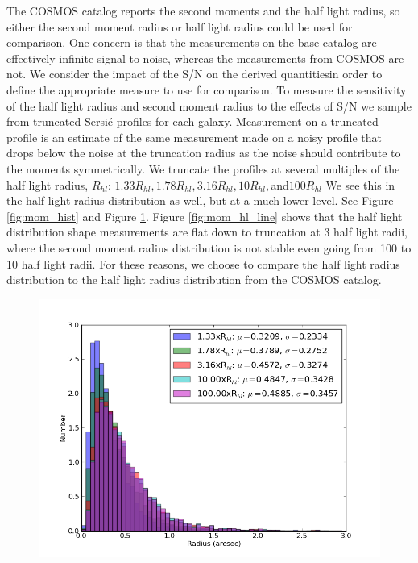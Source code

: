 \documentclass[]{article}
\begin{document}
{The COSMOS catalog reports the second moments and the 
half light radius, so either the second moment radius or half light radius could be used for comparison.  One concern is that the measurements
on the base catalog are effectively infinite signal to noise, whereas the measurements from COSMOS are not.  
We consider the impact of the S/N on the derived quantitiesin order to define the appropriate measure to use for comparison.
To measure the sensitivity of the half light radius and second moment radius to the effects of S/N we 
sample from truncated Sersi{\'c}
profiles for each galaxy.  Measurement on a truncated profile is an estimate of the same measurement made on a noisy profile that drops below
the noise at the truncation radius as the noise should contribute to the moments symmetrically.
We truncate the profiles at several multiples of the half light radius, $R_{hl}$: $1.33R_{hl}, 1.78R_{hl}, 3.16R_{hl}, 10R_{hl}, $and$100R_{hl}$
We see this in the
half light radius distribution as well, but at a much lower level.  See Figure \ref{fig:mom_hist} and Figure \ref{fig:hl_hist}.  Figure
\ref{fig:mom_hl_line} shows that the half light distribution shape measurements are flat down to truncation at 3 half light radii, where 
the second moment radius distribution is not stable even going from 100 to 10 half light radii.  For these reasons, we choose to compare the half light 
radius distribution to the half light radius distribution from the COSMOS catalog.
\begin{figure}[H]
\centering
\includegraphics[width=5in]{validation_figures/half_light_hist.png}
\caption{\label{fig:hl_hist}}
\end{figure}
\begin{figure}[H]

\end{figure}}
\end{document}
